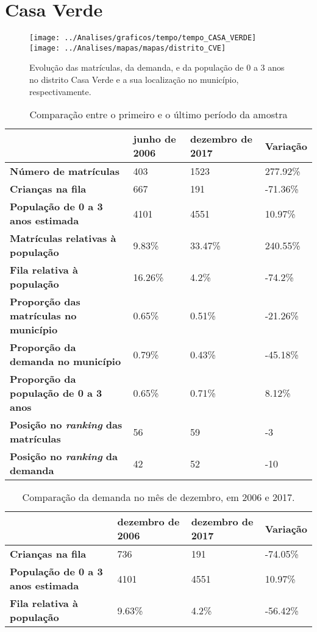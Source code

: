 \section{Casa Verde}
\begin{figure}[H]
	\centering
	\texttt{[image: ../Analises/graficos/tempo/tempo\_CASA\_VERDE]}
	\texttt{[image: ../Analises/mapas/mapas/distrito\_CVE]}
	\caption{Evolução das matrículas, da demanda, e da população de 0 a 3 anos no distrito Casa Verde e a sua localização no município, respectivamente.}
\end{figure}
\begin{table}[H]
	\begin{tabular}{|l|l|l|l|}
		\hline
		\textbf{}                                      & \textbf{junho de 2006}       & \textbf{dezembro de 2017}    & \textbf{Variação} \\ \hline
		\textbf{Número de matrículas}                  & 403 & 1523 & 277.92\% \\ \hline
		\textbf{Crianças na fila}                      & 667 & 191 & -71.36\% \\ \hline
		\textbf{População de 0 a 3 anos estimada}      & 4101 & 4551 & 10.97\% \\ \hline
		\textbf{Matrículas relativas à população}      & 9.83\% & 33.47\% & 240.55\% \\ \hline
		\textbf{Fila relativa à população}             & 16.26\% & 4.2\% & -74.2\% \\ \hline
		\textbf{Proporção das matrículas no município} & 0.65\% & 0.51\% & -21.26\% \\ \hline
		\textbf{Proporção da demanda no município}     & 0.79\% & 0.43\% & -45.18\% \\ \hline
		\textbf{Proporção da população de 0 a 3 anos}  & 0.65\% & 0.71\% & 8.12\% \\ \hline
		\textbf{Posição no \textit{ranking} das matrículas}     & 56 & 59 & -3 \\ \hline
		\textbf{Posição no \textit{ranking} da demanda}         & 42 & 52 & -10 \\ \hline
	\end{tabular}
	\caption{Comparação entre o primeiro e o último período da amostra}
\end{table}
\begin{table}[H]
	\begin{tabular}{|l|l|l|l|}
		\hline
		\textbf{}                                 & \textbf{dezembro de 2006} & \textbf{dezembro de 2017} & \textbf{Variação} \\ \hline
		\textbf{Crianças na fila}                      & 736 & 191 & -74.05\% \\ \hline
		\textbf{População de 0 a 3 anos estimada}      & 4101 & 4551 & 10.97\% \\ \hline
		\textbf{Fila relativa à população}             & 9.63\% & 4.2\% & -56.42\% \\ \hline
	\end{tabular}
	\caption{Comparação da demanda no mês de dezembro, em 2006 e 2017.}
\end{table}
